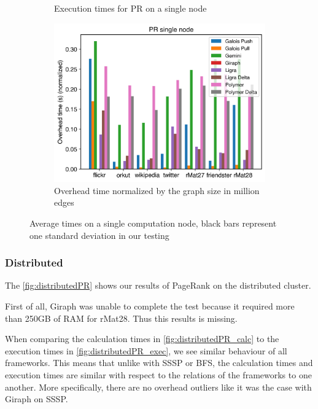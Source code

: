 \begin{figure}
\begin{subfigure}{0.3\textwidth}
		\caption{Execution times for PR on a single node}
		\label{fig:singleNodePR_exec}
	\end{subfigure}
	\hfil
	\begin{subfigure}{0.3\textwidth}
		\includegraphics[width=\linewidth]{../../plots/singleNodePR_overheadTimeNormalized.png}
		\caption{Overhead time normalized by the graph size in million edges}
		\label{fig:singleNodePR_overheadNormalized}
	\end{subfigure}
	
	\caption{Average times on a single computation node, black bars represent one standard deviation in our testing}
\end{figure}



\subsubsection{Distributed}
The \autoref{fig:distributedPR} shows our results of PageRank on the distributed cluster.

First of all, Giraph was unable to complete the test because it required more than 250GB of RAM for rMat28. Thus this results is missing.

When comparing the calculation times in \autoref{fig:distributedPR_calc} to the execution times in \autoref{fig:distributedPR_exec}, we see similar behaviour of all frameworks. This means that unlike with SSSP or BFS, the calculation times and execution times are similar with respect to the relations of the frameworks to one another. More specifically, there are no overhead outliers like it was the case with Giraph on SSSP.

